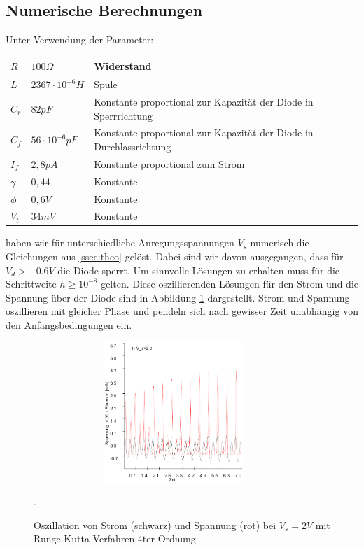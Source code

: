 \documentclass[12pt,a4paper]{article}
\begin{document}
\subsection{ Numerische Berechnungen } \label{ssec:num}
Unter Verwendung der Parameter:
\begin{center}
    \begin{tabular}{ | l | l | p{5cm} |}
    \hline
    $R$ & $100\Omega$ & Widerstand \\ \hline
    $L$ & $2367\cdot10^{-6} H$ & Spule \\ \hline
    $C_r$ & $82 pF$ & Konstante proportional zur Kapazität der Diode in Sperrrichtung \\ \hline
    $C_f$ & $56 \cdot10^{-6}  pF$ & Konstante proportional zur Kapazität der Diode in Durchlassrichtung \\ \hline
    $I_f$ & $2,8pA$ & Konstante proportional zum Strom  \\ \hline
    $\gamma$ & $0,44$ & Konstante \\ \hline
    $\phi$ & $0,6V$ & Konstante \\ \hline
    $V_t$ & $34mV$ & Konstante \\
    \hline
    \end{tabular}
\end{center}

haben wir für unterschiedliche Anregungsspannungen $V_s$ numerisch die Gleichungen aus  \ref{ssec:theo} gelöst. Dabei sind wir davon ausgegangen, dass für $V_d > -0.6V$ die Diode sperrt.
\newline
Um sinnvolle Lösungen zu erhalten muss für die Schrittweite $h \geq 10^{-8}$ gelten. Diese oszillierenden Lösungen für den Strom und die Spannung über der Diode sind in Abbildung \ref{fig:ldr-oszi} dargestellt. Strom und Spannung oszillieren mit gleicher Phase und pendeln sich nach gewisser Zeit unabhängig von den Anfangsbedingungen ein.
\begin{figure}[!htbp]
\centering
\includegraphics[height=200px,width=400px]{runge-oszillation-100k-2V}
\caption{Oszillation von Strom (schwarz) und Spannung (rot) bei $V_s=2V$ mit Runge-Kutta-Verfahren 4ter Ordnung}. 
\label{fig:ldr-oszi}
\end{figure}
\end{document}
